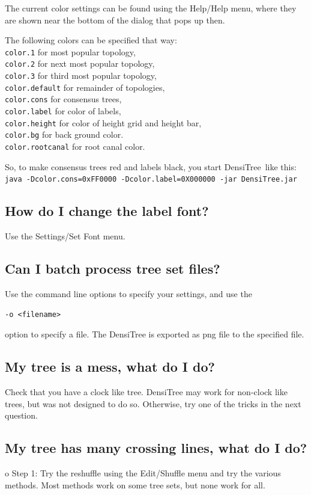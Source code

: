\documentclass{article}
\def\DensiTree{DensiTree}
\begin{document}
The current color settings can be found using the Help/Help menu, where they
are shown near the bottom of the dialog that pops up then.

The following colors can be specified that way:\\
{\tt color.1} for most popular topology,\\
{\tt color.2} for next most  popular topology,\\
{\tt color.3} for third most popular topology,\\
{\tt color.default} for remainder of topologies,\\
{\tt color.cons} for consensus trees,\\
{\tt color.label} for color of labels,\\
{\tt color.height} for color of height grid and height bar,\\
{\tt color.bg} for back ground color.\\
{\tt color.rootcanal} for root canal color.

So, to make consensus trees red and labels black, you start
\DensiTree\ like this:\\
{\tt java -Dcolor.cons=0xFF0000 -Dcolor.label=0X000000 -jar DensiTree.jar}\\

\subsection{How do I change the label font?}
Use the Settings/Set Font menu.

\subsection{Can I batch process tree set files?}
Use the command line options to specify your settings, and use the 
\begin{verbatim}-o <filename>\end{verbatim} option to specify a file.
The DensiTree is exported as png file to the specified file.

\subsection{My tree is a mess, what do I do?}

Check that you have a clock like tree. DensiTree may work for non-clock like trees, but
was not designed to do so. Otherwise, try one of the tricks in the next question.

\subsection{My tree has many crossing lines, what do I do?}
\noindent o Step 1: Try the reshuffle using the Edit/Shuffle menu and try the various methods.
Most methods work on some tree sets, but none work for all.
\end{document}
